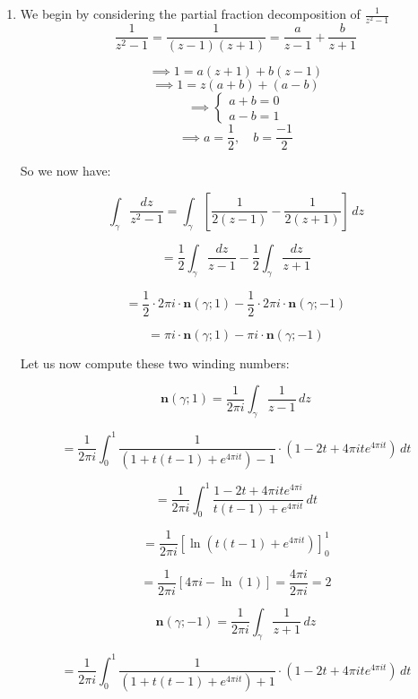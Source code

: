 \documentclass[12pt]{article}
\begin{document}
\noindent \begin{enumerate}[label=\textbf{(\roman*)}]
\item We begin by considering the partial fraction decomposition of \(\frac{1}{z^2-1}\)
\[
\frac{1}{z^2-1} = \frac{1}{\left(z-1\right)\left(z+1\right)} = \frac{a}{z-1} + \frac{b}{z+1}
\]

\[
\implies 1 = a\left(z+1\right) + b\left(z-1\right)
\]
\[
\implies 1 = z\left(a+b\right) + \left(a-b\right)
\]
\[ \implies
\left\{
\begin{array}{ll}
a + b = 0 \\
a - b = 1
\end{array}
\right.
\]
\[
\implies a = \frac{1}{2},\quad b=\frac{-1}{2}
\]

\noindent So we now have:

\[
    \int_{\gamma} \frac{dz}{z^2 - 1} = \int_{\gamma} \left[ \frac{1}{2\left(z-1\right)}  - \frac{1}{2\left(z+1\right)} \right] \, dz
\]

\[
= \frac{1}{2} \int_{\gamma} \frac{dz}{z-1} - \frac{1}{2} \int_{\gamma} \frac{dz}{z+1}
\]

\[
= \frac{1}{2} \cdot 2\pi i \cdot \mathbf{n}\left(\gamma;1\right) - \frac{1}{2} \cdot 2\pi i \cdot \mathbf{n}\left(\gamma;-1\right)
\]

\[
  =\pi i \cdot \mathbf{n}\left(\gamma;1\right) -\pi i \cdot \mathbf{n}\left(\gamma;-1\right)
\]

\noindent Let us now compute these two winding numbers:

\[
\mathbf{n}\left(\gamma;1\right) = \frac{1}{2\pi i} \int_{\gamma} \frac{1}{z-1} \, dz
\]

\[
    = \frac{1}{2\pi i} \int_{0}^{1} \frac{1}{\left(1+t\left(t-1\right)+e^{4\pi i t}\right)-1} \cdot \left(1-2t + 4\pi it e^{4\pi it}\right)\, dt
\]

\[
    = \frac{1}{2\pi i} \int_{0}^{1} \frac{1-2t + 4\pi it e^{4\pi i}}{t\left(t-1\right)+e^{4\pi i t}} \, dt
\]

\[
    = \frac{1}{2\pi i} \left[ \ln\left( t\left(t-1\right)+e^{4\pi i t}\right) \right]_{0}^{1}
\]

\[
= \frac{1}{2\pi i} \left[4\pi i - \ln\left(1\right)  \right] = \frac{4\pi i}{2\pi i} = 2
\]

\[
    \mathbf{n}\left(\gamma;-1\right) = \frac{1}{2\pi i} \int_{\gamma} \frac{1}{z+1} \, dz
\]


\[
    = \frac{1}{2\pi i} \int_{0}^{1} \frac{1}{\left(1+t\left(t-1\right)+e^{4\pi i t}\right)+1} \cdot \left(1-2t + 4\pi it e^{4\pi it}\right)\, dt
\]


\end{enumerate}
\end{document}
